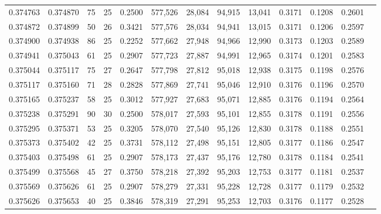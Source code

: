 \begin{tabular}{rrrrrrrrrrrrr}
0.374763 & 0.374870 &    75 &  25 &                                     0.2500 & 577,526 &  28,084 &  94,915 &  13,041 & 0.3171 & 0.1208 & 0.2601 \\
0.374872 & 0.374899 &    50 &  26 &                                     0.3421 & 577,576 &  28,034 &  94,941 &  13,015 & 0.3171 & 0.1206 & 0.2597 \\
0.374900 & 0.374938 &    86 &  25 &                                     0.2252 & 577,662 &  27,948 &  94,966 &  12,990 & 0.3173 & 0.1203 & 0.2589 \\
0.374941 & 0.375043 &    61 &  25 &                                     0.2907 & 577,723 &  27,887 &  94,991 &  12,965 & 0.3174 & 0.1201 & 0.2583 \\
0.375044 & 0.375117 &    75 &  27 &                                     0.2647 & 577,798 &  27,812 &  95,018 &  12,938 & 0.3175 & 0.1198 & 0.2576 \\
0.375117 & 0.375160 &    71 &  28 &                                     0.2828 & 577,869 &  27,741 &  95,046 &  12,910 & 0.3176 & 0.1196 & 0.2570 \\
0.375165 & 0.375237 &    58 &  25 &                                     0.3012 & 577,927 &  27,683 &  95,071 &  12,885 & 0.3176 & 0.1194 & 0.2564 \\
0.375238 & 0.375291 &    90 &  30 &                                     0.2500 & 578,017 &  27,593 &  95,101 &  12,855 & 0.3178 & 0.1191 & 0.2556 \\
0.375295 & 0.375371 &    53 &  25 &                                     0.3205 & 578,070 &  27,540 &  95,126 &  12,830 & 0.3178 & 0.1188 & 0.2551 \\
0.375373 & 0.375402 &    42 &  25 &                                     0.3731 & 578,112 &  27,498 &  95,151 &  12,805 & 0.3177 & 0.1186 & 0.2547 \\
0.375403 & 0.375498 &    61 &  25 &                                     0.2907 & 578,173 &  27,437 &  95,176 &  12,780 & 0.3178 & 0.1184 & 0.2541 \\
0.375499 & 0.375568 &    45 &  27 &                                     0.3750 & 578,218 &  27,392 &  95,203 &  12,753 & 0.3177 & 0.1181 & 0.2537 \\
0.375569 & 0.375626 &    61 &  25 &                                     0.2907 & 578,279 &  27,331 &  95,228 &  12,728 & 0.3177 & 0.1179 & 0.2532 \\
0.375626 & 0.375653 &    40 &  25 &                                     0.3846 & 578,319 &  27,291 &  95,253 &  12,703 & 0.3176 & 0.1177 & 0.2528 \\

\end{tabular}
